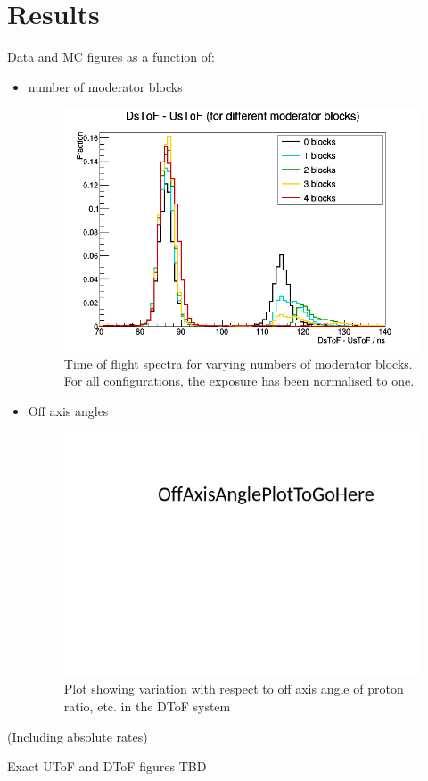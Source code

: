 \section{Results}
\label{hptpcPaper:sec:Results}
Data and MC figures as a function of:
\begin{itemize}
    \item number of moderator blocks
    \begin{figure}[h]
        \centering
        \includegraphics[width=0.7\linewidth]{files/Figures/AllInOne.png}
        \caption{Time of flight spectra for varying numbers of moderator blocks. For all configurations, the exposure has been normalised to one.}
        \label{fig:dtof_nmodblocks}
    \end{figure}
    \item Off axis angles
    \begin{figure}
        \centering
        \includegraphics[width=0.7\linewidth]{files/Figures/OffAxisAngleDToFPlotToGoHere.png}
        \caption{Plot showing variation with respect to off axis angle of proton ratio, etc. in the DToF system}
        \label{fig:dtof_nmodblocks}
    \end{figure}
\end{itemize}
(Including absolute rates)

Exact UToF and DToF figures TBD